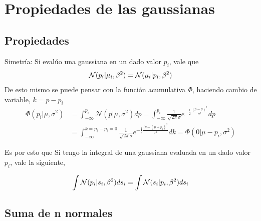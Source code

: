 \documentclass[11pt,twoside,spanish]{report} %
\begin{document}



\appendix
\chapter{Propiedades de las gaussianas}
%
\label{appendix:gauss}

\section{Propiedades}

Simetr\'ia:  Si eval\'uo una gaussiana en un dado valor $p_i$, vale que
\begin{equation}
	\centering
	\mathcal{N}(p_i \vert \mu_i,\beta^2) =  \mathcal{N}(\mu_i \vert p_i,\beta^2)
\end{equation}
De esto mismo se puede pensar con la funci\'on acumulativa $\Phi$, haciendo cambio de variable, $k=p-p_i$
\begin{equation}
	\begin{split}
		\Phi(p_i \vert \mu,\sigma^2) &= \int_{-\infty}^{p_i} \mathcal{N}(p \vert \mu,\sigma^2) dp = \int_{-\infty}^{p_i} \frac{1}{\sqrt{2\pi}\sigma}e^{-\frac{1}{2}\frac{(p-\mu)^2}{\sigma^2}} dp\\
		& = \int_{-\infty}^{k=p_i-p_i=0} \frac{1}{\sqrt{2\pi}\sigma}e^{-\frac{1}{2}\frac{(k-(\mu+p_i)^2}{\sigma^2}}dk= \Phi(0 \vert \mu-p_i,\sigma^2)
	\end{split}
\end{equation}

Es por esto que Si tengo la integral de una gaussiana evaluada en un dado valor $p_i$, vale la siguiente,

\begin{equation}
	\centering
	\int \mathcal{N}(p_i \vert s_i,\beta^2) ds_i =  \int \mathcal{N}(s_i \vert p_i,\beta^2)ds_i
\end{equation}

\section{Suma de n normales}\label{suma_normales_induccion}
\end{document}
